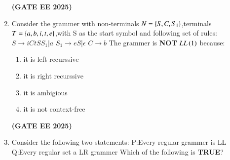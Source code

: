 \documentclass[journal,12pt,onecolumn]{IEEEtran}
\theoremstyle{remark}
\begin{document}
\begin{enumerate}
\begin{enumerate}
     \end{enumerate}
     \hfill \textbf{(GATE EE 2025)}
     \item Consider the grammer with non-terminals $N=\left\{S,C,S_1\right\}$,terminals $T=\left\{a,b,i,t,e\right\}$,with S as the start symbol and following set of rules:
     \newline
     $S\longrightarrow iCtSS_1|a$
     \newline
     $S_1\longrightarrow eS|\epsilon$
     \newline
     $C \longrightarrow b$
    \newline
    The grammer is \textbf{NOT} $LL\left(1\right)$ because:
    \begin{enumerate}
        \item it is left recurssive 
        \item it is right recurssive
        \item it is ambigious
        \item it is not context-free
    \end{enumerate}
    \hfill \textbf{(GATE EE 2025)}
    
      
    \item Consider the following two statements:
    \newline
    P:Every regular grammer is LL
    \newline 
    Q:Every regular set a LR grammer
    \newline 
    Which of the following is \textbf{TRUE}?
    \begin{enumerate}
\end{enumerate}
\end{enumerate}
\end{document}
